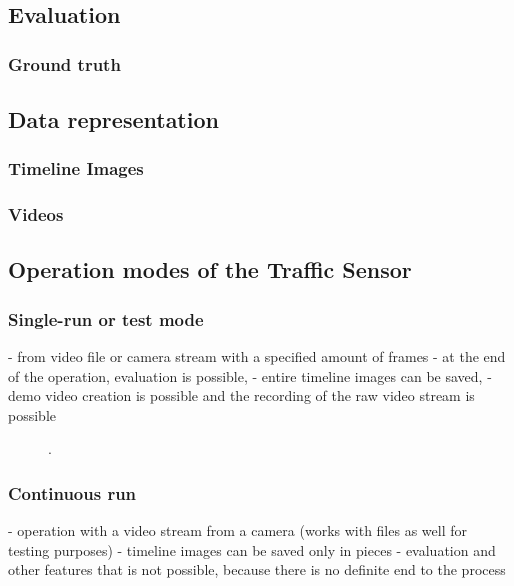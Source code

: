 \subsection{Evaluation}

\subsubsection{Ground truth}


\subsection{Data representation}
\subsubsection{Timeline Images}

\subsubsection{Videos}
\subsection{Operation modes of the Traffic Sensor}
\subsubsection{Single-run or test mode} 
- from video file or camera stream with a specified amount of frames 
- at the end of the operation, evaluation is possible, 
- entire timeline images can be saved, 
- demo video creation is possible and the recording of the raw video stream is possible

\begin{figure}[!h]
	\centering
	
	\caption{. \label{fig:run_types}}
\end{figure}

\subsubsection{Continuous run}
- operation with a video stream from a camera (works with files as well for testing purposes)
- timeline images can be saved only in pieces
- evaluation and other features that is not possible, because there is no definite end to the process
